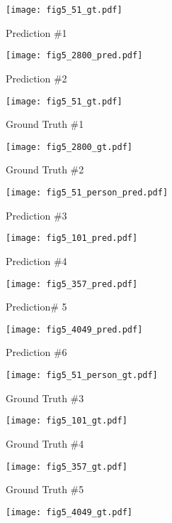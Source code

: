 \documentclass[preprint,review,3p]{elsarticle}
\begin{document}
\begin{figure}
  \centering
  \begin{subfigure}[b]{0.48\textwidth}
  \texttt{[image: fig5\_51\_gt.pdf]}
  \caption{Prediction \#1}
  \end{subfigure}
  \begin{subfigure}[b]{0.48\textwidth}
  \texttt{[image: fig5\_2800\_pred.pdf]}
  \caption{Prediction \#2}
  \end{subfigure}
 \begin{subfigure}[b]{0.48\textwidth}
  \texttt{[image: fig5\_51\_gt.pdf]}
  \caption{Ground Truth \#1}
  \end{subfigure}
  \begin{subfigure}[b]{0.48\textwidth}
  \texttt{[image: fig5\_2800\_gt.pdf]}
  \caption{Ground Truth \#2}
  \end{subfigure}
  \begin{subfigure}[b]{0.24\textwidth}
  \texttt{[image: fig5\_51\_person\_pred.pdf]}
  \caption{Prediction \#3}
  \end{subfigure}
  \begin{subfigure}[b]{0.24\textwidth}
  \texttt{[image: fig5\_101\_pred.pdf]}
  \caption{Prediction \#4}
  \end{subfigure}
  \begin{subfigure}[b]{0.24\textwidth}
  \texttt{[image: fig5\_357\_pred.pdf]}
  \caption{Prediction\# 5}
  \end{subfigure}
  \begin{subfigure}[b]{0.24\textwidth}
  \texttt{[image: fig5\_4049\_pred.pdf]}
  \caption{Prediction \#6}
  \end{subfigure}
  \begin{subfigure}[b]{0.24\textwidth}
  \texttt{[image: fig5\_51\_person\_gt.pdf]}
  \caption{Ground Truth \#3}
  \end{subfigure}
  \begin{subfigure}[b]{0.24\textwidth}
  \texttt{[image: fig5\_101\_gt.pdf]}
  \caption{Ground Truth \#4}
  \end{subfigure}
  \begin{subfigure}[b]{0.24\textwidth}
  \texttt{[image: fig5\_357\_gt.pdf]}
  \caption{Ground Truth \#5}
  \end{subfigure}
  \begin{subfigure}[b]{0.24\textwidth}
  \texttt{[image: fig5\_4049\_gt.pdf]}

\end{subfigure}
\end{figure}
\end{document}
